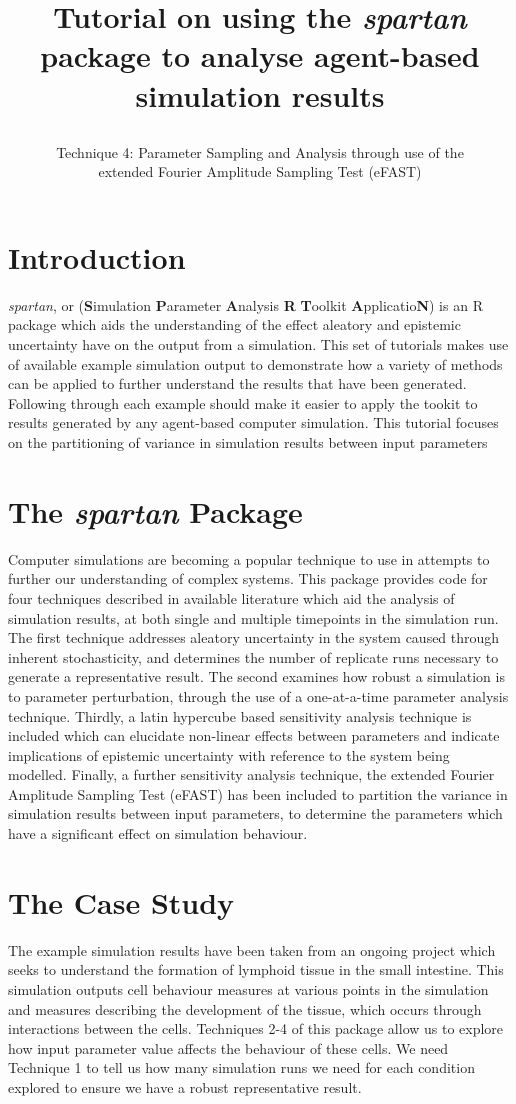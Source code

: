 \documentclass[a4paper,11pt]{article}
\title{\huge \textbf{Tutorial on using the \textit{spartan} package to analyse agent-based simulation results}\\
\author{\Large Technique 4: Parameter Sampling and Analysis through use of the \\ 
		\Large extended Fourier Amplitude Sampling Test (eFAST)}
\date{}
}
\begin{document}
\maketitle

\section{Introduction}
\noindent \textit{spartan}, or (\textbf{S}imulation \textbf{P}arameter \textbf{A}nalysis \textbf{R} \textbf{T}oolkit \textbf{A}pplicatio\textbf{N}) is an R package which aids the understanding of the effect aleatory and epistemic uncertainty have on the output from a simulation. This set of tutorials makes use of available example simulation output to demonstrate how a variety of methods can be applied to further understand the results that have been generated.  Following through each example should make it easier to apply the tookit to results generated by any agent-based computer simulation.  This tutorial focuses on the partitioning of variance in simulation results between input parameters

\section{The \textit{spartan} Package}
\noindent Computer simulations are becoming a popular technique to use in attempts to further our understanding of complex systems. This package provides code for four techniques described in available literature which aid the analysis of simulation results, at both single and multiple timepoints in the simulation run. The first technique addresses aleatory uncertainty in the system caused through inherent stochasticity, and determines the number of replicate runs necessary to generate a representative result. The second examines how robust a simulation is to parameter perturbation, through the use of a one-at-a-time parameter analysis technique. Thirdly, a latin hypercube based sensitivity analysis technique is included which can elucidate non-linear effects between parameters and indicate implications of epistemic uncertainty with reference to the system being modelled. Finally, a further sensitivity analysis technique, the extended Fourier Amplitude Sampling Test (eFAST) has been included to partition the variance in simulation results between input parameters, to determine the parameters which have a significant effect on simulation behaviour.

\section{The Case Study}
\noindent The example simulation results have been taken from an ongoing project which seeks to understand the formation of lymphoid tissue in the small intestine. This simulation outputs cell behaviour measures at various points in the simulation and measures describing the development of the tissue, which occurs through interactions between the cells. Techniques 2-4 of this package allow us to explore how input parameter value affects the behaviour of these cells. We need Technique 1 to tell us how many simulation runs we need for each condition explored to ensure we have a robust representative result.
\end{document}
